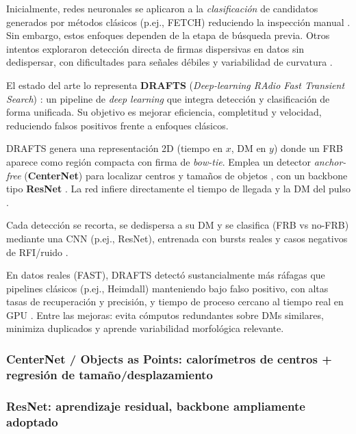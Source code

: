 Inicialmente, redes neuronales se aplicaron a la \textit{clasificación} de candidatos 
generados por métodos clásicos (p.ej., FETCH) reduciendo la inspección manual 
\citep{Agarwal_2020,Petroff_2022}. Sin embargo, estos enfoques dependen de la etapa de búsqueda previa.
 Otros intentos exploraron detección directa de firmas dispersivas en datos sin de\-dispersar, con 
 dificultades para señales débiles y variabilidad de curvatura \citep{Zhang_2020}.

El estado del arte lo representa \textbf{DRAFTS} (\textit{Deep-learning RAdio Fast Transient Search}) 
\citep{zhang2024drafts}: un pipeline de \textit{deep learning} que integra detección y 
clasificación de forma unificada. Su objetivo es mejorar eficiencia, completitud y velocidad, 
reduciendo falsos positivos frente a enfoques clásicos.

DRAFTS genera una representación 2D (tiempo en $x$, DM en $y$) donde un FRB aparece como región 
compacta con firma de \textit{bow-tie}. Emplea un detector \textit{anchor-free} (\textbf{CenterNet}) 
para localizar centros y tamaños de objetos \citep{Zhou_2019_CenterNet}, con un backbone tipo 
\textbf{ResNet} \citep{He_2015_ResNet}. La red infiere directamente el tiempo de llegada y la 
DM del pulso \citep{zhang2024drafts}.

Cada detección se recorta, se de\-dispersa a su DM y se clasifica (FRB vs no-FRB) mediante una 
CNN (p.ej., ResNet), entrenada con bursts reales y casos negativos de RFI/ruido 
\citep{Agarwal_2020,zhang2024drafts}.

En datos reales (FAST), DRAFTS detectó sustancialmente más ráfagas que pipelines clásicos 
(p.ej., Heimdall) manteniendo bajo falso positivo, con altas tasas de recuperación y precisión, 
y tiempo de proceso cercano al tiempo real en GPU \citep{zhang2024drafts,Heimdall_Use}. 
Entre las mejoras: evita cómputos redundantes sobre DMs similares, minimiza duplicados y 
aprende variabilidad morfológica relevante.

\subsubsection{CenterNet / Objects as Points: calorímetros de centros + regresión de tamaño/desplazamiento}

\subsubsection{ResNet: aprendizaje residual, backbone ampliamente adoptado}

